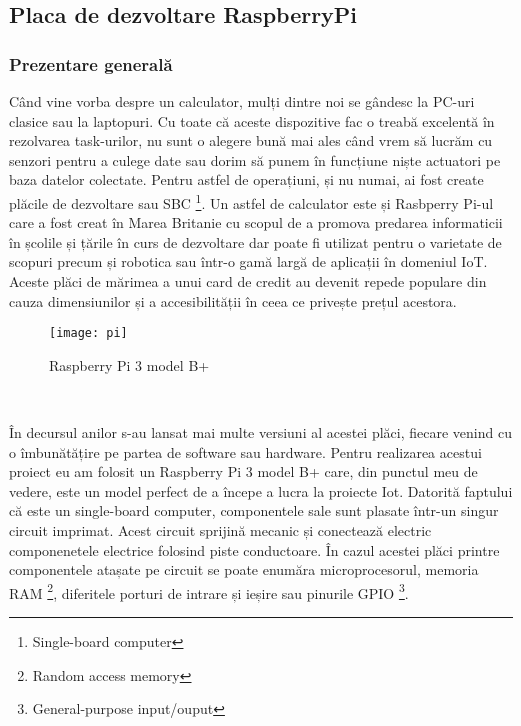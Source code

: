 \documentclass[../IoMusT.tex]{subfiles}
\begin{document}
\subsection{Placa de dezvoltare RaspberryPi}
\subsubsection{Prezentare generală}
Când vine vorba despre un calculator, mulți dintre noi se gândesc la PC-uri clasice sau la laptopuri. Cu toate că aceste dispozitive fac o treabă excelentă în rezolvarea task-urilor, nu sunt o alegere bună mai ales când vrem să lucrăm cu senzori pentru a culege date sau dorim să punem în funcțiune niște actuatori pe baza datelor colectate. Pentru astfel de operațiuni, și nu numai, ai fost create plăcile de dezvoltare sau SBC \footnote{Single-board computer}. Un astfel de calculator este și Rasbperry Pi-ul care a fost creat în Marea Britanie cu scopul de a promova predarea informaticii în școlile și țările în curs de dezvoltare \cite{SBC} dar poate fi utilizat pentru o varietate de scopuri precum și robotica sau într-o gamă largă de aplicații în domeniul IoT. Aceste plăci de mărimea a unui card de credit au devenit repede populare din cauza dimensiunilor și a accesibilității în ceea ce privește prețul acestora. 
\begin{figure}[h]
\centering
\texttt{[image: pi]}
\caption{Raspberry Pi 3 model B+}
\end{figure}
\\
\par În decursul anilor s-au lansat mai multe versiuni al acestei plăci, fiecare venind cu o îmbunătățire pe partea de software sau hardware. Pentru realizarea acestui proiect eu am folosit un Raspberry Pi 3 model B+ care, din punctul meu de vedere, este un model perfect de a începe a lucra la proiecte Iot. Datorită faptului că este un single-board computer, componentele sale sunt plasate într-un singur circuit imprimat. Acest circuit sprijină mecanic și conectează electric componenetele electrice folosind piste conductoare. În cazul acestei plăci printre componentele atașate pe circuit se poate enumăra microprocesorul, memoria RAM \footnote{Random access memory}, diferitele porturi de intrare și ieșire sau pinurile GPIO \footnote{General-purpose input/ouput}.
\\
\par
\end{document}
